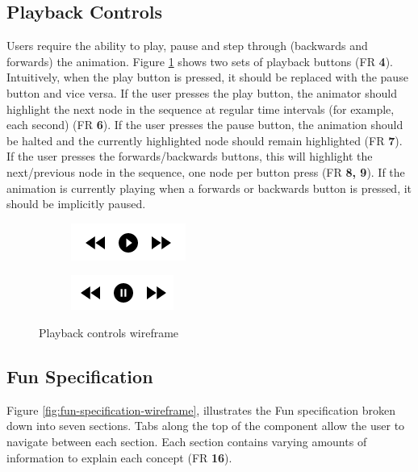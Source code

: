 \documentclass{l4proj}
\begin{document}
\subsection{Playback Controls}
Users require the ability to play, pause and step through (backwards and forwards) the animation. Figure \ref{fig:playback-wireframe} shows two sets of playback buttons (FR \textbf{4}). Intuitively, when the play button is pressed, it should be replaced with the pause button and vice versa. If the user presses the play button, the animator should highlight the next node in the sequence at regular time intervals (for example, each second) (FR \textbf{6}). If the user presses the pause button, the animation should be halted and the currently highlighted node should remain highlighted (FR \textbf{7}). If the user presses the forwards/backwards buttons, this will highlight the next/previous node in the sequence, one node per button press (FR \textbf{8, 9}). If the animation is currently playing when a forwards or backwards button is pressed, it should be implicitly paused.

\begin{figure}[h]
	\centering
	\begin{subfigure}[b]{.5\textwidth}
		\centering
		\includegraphics[width=.5\linewidth]{images/playback-play-wireframe.png}
	\end{subfigure}%
	\begin{subfigure}[b]{.5\textwidth}
		\centering
		\includegraphics[width=.5\linewidth]{images/playback-pause-wireframe.png}
	\end{subfigure}
	\caption{Playback controls wireframe}\label{fig:playback-wireframe}	
\end{figure}

\subsection{Fun Specification}
 Figure \ref{fig:fun-specification-wireframe}, illustrates the Fun specification broken down into seven sections. Tabs along the top of the component allow the user to navigate between each section. Each section contains varying amounts of information to explain each concept (FR \textbf{16}).
 
\end{document}

